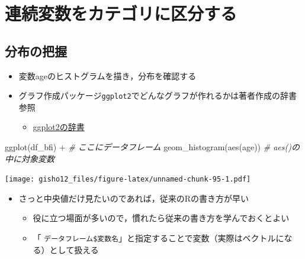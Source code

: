 \documentclass[
  xelatex,ja=standard, b5paper]{bxjsbook}
\newenvironment{Shaded}{\begin{snugshade}}{\end{snugshade}}
\newcommand{\CommentTok}[1]{\textcolor[rgb]{0.56,0.35,0.01}{\textit{#1}}}
\newcommand{\FunctionTok}[1]{\textcolor[rgb]{0.00,0.00,0.00}{#1}}
\newcommand{\NormalTok}[1]{#1}
\newcommand{\SpecialCharTok}[1]{\textcolor[rgb]{0.00,0.00,0.00}{#1}}
\providecommand{\tightlist}{%
  \setlength{\itemsep}{0pt}\setlength{\parskip}{0pt}}
\begin{document}
\hypertarget{ux9023ux7d9aux5909ux6570ux3092ux30abux30c6ux30b4ux30eaux306bux533aux5206ux3059ux308b}{%
\section{連続変数をカテゴリに区分する}\label{ux9023ux7d9aux5909ux6570ux3092ux30abux30c6ux30b4ux30eaux306bux533aux5206ux3059ux308b}}

\hypertarget{ux5206ux5e03ux306eux628aux63e1}{%
\subsection{分布の把握}\label{ux5206ux5e03ux306eux628aux63e1}}

\begin{itemize}
\tightlist
\item
  変数ageのヒストグラムを描き，分布を確認する
\item
  グラフ作成パッケージ\texttt{ggplot2}でどんなグラフが作れるかは著者作成の辞書参照

  \begin{itemize}
  \tightlist
  \item
    \href{https://izunyan.github.io/practice_ggplot2/}{ggplot2の辞書}
  \end{itemize}
\end{itemize}

\begin{Shaded}
\begin{Highlighting}[]
\FunctionTok{ggplot}\NormalTok{(df\_bfi) }\SpecialCharTok{+}           \CommentTok{\# ここにデータフレーム}
  \FunctionTok{geom\_histogram}\NormalTok{(}\FunctionTok{aes}\NormalTok{(age)) }\CommentTok{\# aes()の中に対象変数}
\end{Highlighting}
\end{Shaded}

\texttt{[image: gisho12\_files/figure-latex/unnamed-chunk-95-1.pdf]}

\begin{itemize}
\tightlist
\item
  さっと中央値だけ見たいのであれば，従来のRの書き方が早い

  \begin{itemize}
  \tightlist
  \item
    役に立つ場面が多いので，慣れたら従来の書き方を学んでおくとよい
  \item
    「 \texttt{データフレーム\$変数名}」と指定することで変数（実際はベクトルになる）として扱える
  \end{itemize}
\end{itemize}
\end{document}
